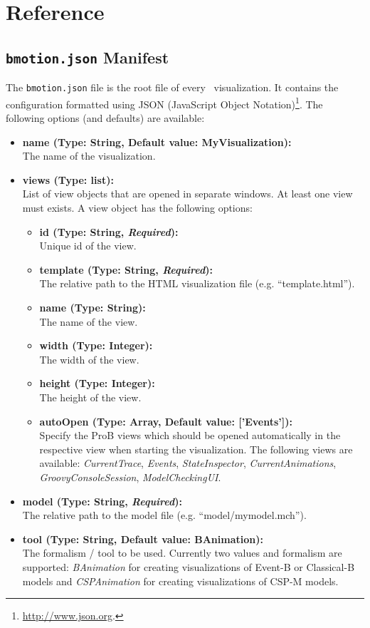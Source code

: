\section{Reference}
\label{reference}

\subsection{\texttt{bmotion.json} Manifest}
\label{sec:manifest}

The \texttt{bmotion.json} file is the root file of every \bms\ visualization.
It contains the configuration formatted using JSON (JavaScript Object Notation)\footnote{\url{http://www.json.org}.}.
The following options (and defaults) are available:

\begin{itemize}
	\item[] \textbf{name (Type: String, Default value: MyVisualization):}\\The name of the visualization. 
	\item[] \textbf{views (Type: list):}\\ List of view objects that are opened in separate windows.
	At least one view must exists.
	A view object has the following options:
	\begin{itemize}
		\item[] \textbf{id (Type: String, \textit{Required}):}\\ Unique id of the view.
		\item[] \textbf{template (Type: String, \textit{Required}):}\\ The relative path to the HTML visualization file (e.g. ``template.html'').
		\item[] \textbf{name (Type: String):}\\ The name of the view.
		\item[] \textbf{width (Type: Integer):}\\ The width of the view.
		\item[] \textbf{height (Type: Integer):}\\ The height of the view.
		\item[] \textbf{autoOpen (Type: Array, Default value: ['Events']):}\\Specify the ProB views which should be opened automatically in the respective view when starting the visualization. 
The following views are available: \textit{CurrentTrace}, \textit{Events}, \textit{StateInspector}, \textit{CurrentAnimations}, \textit{GroovyConsoleSession}, \textit{ModelCheckingUI}.
	\end{itemize}
	\item[] \textbf{model (Type: String, \textit{Required}):}\\The relative path to the model file (e.g. ``model/mymodel.mch'').
	\item[] \textbf{tool (Type: String, Default value: BAnimation):}\\The formalism / tool to be used. Currently two values and formalism are supported: \textit{BAnimation} for creating visualizations of Event-B or Classical-B models and \textit{CSPAnimation} for creating visualizations of CSP-M models.
\end{itemize}

